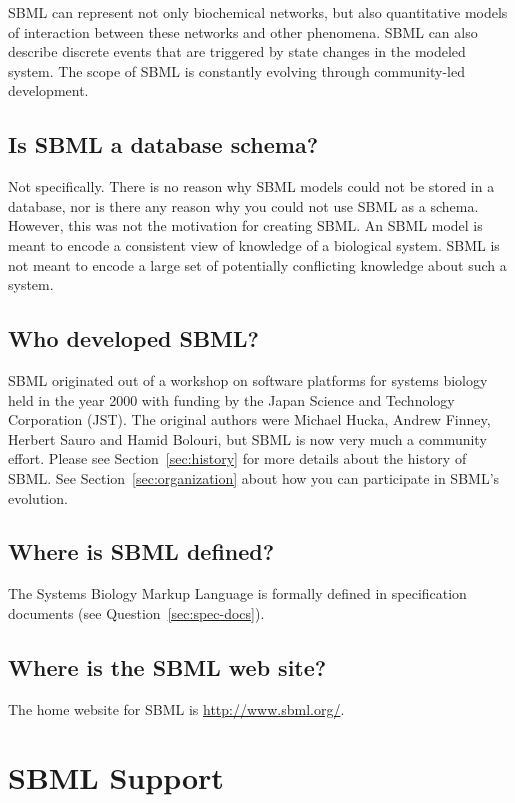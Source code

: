 \documentclass{sbmlfaq}
\begin{document}
SBML can represent not only biochemical networks, but also quantitative
models of interaction between these networks and other phenomena.  SBML can
also describe discrete events that are triggered by state changes in the
modeled system.  The scope of SBML is constantly evolving through 
community-led development.

\subsection{Is SBML a database schema?}

Not specifically.  There is no reason why SBML models could not be stored
in a database, nor is there any reason why you could not use SBML as a
schema.  However, this was not the motivation for creating SBML.  An SBML
model is meant to encode a consistent view of knowledge of a biological
system.  SBML is not meant to encode a large set of potentially conflicting
knowledge about such a system.

\subsection{Who developed SBML?}

SBML originated out of a workshop on software platforms for systems biology
held in the year 2000 with funding by the Japan Science and Technology
Corporation (JST).  The original authors were Michael Hucka, Andrew Finney,
Herbert Sauro and Hamid Bolouri, but SBML is now very much a community
effort.  Please see Section~\ref{sec:history} for more details about the
history of SBML.  See Section~\ref{sec:organization} about how you can
participate in SBML's evolution.

\subsection{Where is SBML defined?}

The Systems Biology Markup Language is formally defined in specification
documents (see Question~\ref{sec:spec-docs}).

\subsection{Where is the SBML web site?}

The home website for SBML is \url{http://www.sbml.org/}.


\section{SBML Support}
\label{sec:sbml-support}
\end{document}
